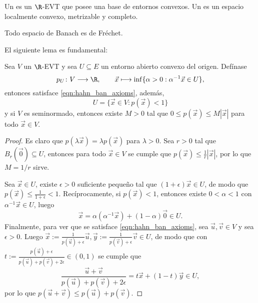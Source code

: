 \documentclass[topologia-analisis.tex]{subfiles}
\begin{document}
\begin{mydef}
	Un  es un $\R$-EVT que posee una base de entornos convexos.
	Un  es un espacio localmente convexo, metrizable y completo.
\end{mydef}
\begin{cor}
	Todo espacio de Banach es de Fréchet.
\end{cor}

El siguiente lema es fundamental:
\begin{lem}\label{thm:GHB_seminorm_lemma}
	Sea $V$ un $\R$-EVT y sea $U \subseteq E$ un entorno abierto convexo del origen.
	Defínase
	\[
		p_U \colon V \longrightarrow \R, \qquad \vec x \longmapsto \inf\{ \alpha > 0 : \alpha^{-1}\vec x \in U \},
	\]
	entonces satisface \eqref{eqn:hahn_ban_axioms}, además,
	\[
		U = \{ \vec x \in V : p(\vec x) < 1 \}
	\]
	y si $V$ es seminormado, entonces existe $M > 0$ tal que $0 \le p(\vec x) \le M|\vec x|$ para todo $\vec x \in V$.
\end{lem}
\begin{proof}
	Es claro que $p(\lambda\vec x) = \lambda p(\vec x)$ para $\lambda > 0$.
	Sea $r > 0$ tal que $B_r(\Vec 0) \subseteq U$, entonces para todo $\vec x \in V$ se cumple que $p(\vec x) \le \frac{1}{r}|\vec x|$,
	por lo que $M = 1/r$ sirve.

	Sea $\vec x \in U$, existe $\epsilon > 0$ suficiente pequeño tal que $(1 + \epsilon)\vec x \in U$, de modo que $p(\vec x) \le \frac{1}{1+\epsilon} < 1$.
	Recíprocamente, si $p(\vec x) < 1$, entonces existe $0 < \alpha < 1$ con $\alpha^{-1}\vec x \in U$, luego
	\[
		\vec x = \alpha(\alpha^{-1}\vec x) + (1 - \alpha)\Vec 0 \in U.
	\]
	Finalmente, para ver que se satisface \eqref{eqn:hahn_ban_axioms}, sea $\vec u, \vec v \in V$ y sea $\epsilon > 0$.
	Luego $\vec x := \frac{1}{p(\vec u) + \epsilon} \vec u, \vec y := \frac{1}{p(\vec v) + \epsilon} \vec v \in U$, de modo que con
	$t := \frac{p(\vec u) + \epsilon}{p(\vec u) + p(\vec v) + 2\epsilon} \in (0, 1)$ se cumple que
	\[
		\frac{\vec u + \vec v}{p(\vec u) + p(\vec v) + 2\epsilon} = t\vec x + (1 - t)\vec y \in U,
	\]
	por lo que $p(\vec u + \vec v) \le p(\vec u) + p(\vec v)$.
\end{proof}
\end{document}
